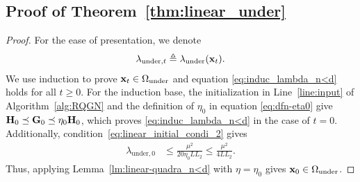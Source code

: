 \documentclass[11pt]{article}
\theoremstyle{plain}
\theoremstyle{definition}
\theoremstyle{remark}
\theoremstyle{plain}
\def\G{{\bf G}}
\def\H{{\bf H}}
\def\x{{\bf x}}
\begin{document}
\subsection{Proof of Theorem~\ref{thm:linear_under}}
\label{app:proof_theorem_linear_under}
\begin{proof}
For the ease of presentation, we denote
\begin{align*}
\lambda_{\mathrm{under},t}\triangleq\lambda_{\mathrm{under}}(\x_t).    
\end{align*}
We use induction to prove  $\x_t\in\Omega_{\mathrm{under}}$ and equation \eqref{eq:induc_lambda_n<d} holds for all $t\geq 0$.
For the induction base, the initialization in Line~\ref{line:input} of
Algorithm~\ref{alg:RQGN} and the definition of $\eta_0$ in equation \eqref{eq:dfn-eta0} give~$\H_0\preceq\G_0\preceq\eta_0\H_0$, which proves \eqref{eq:induc_lambda_n<d} in the case of $t=0$.
Additionally, condition~\eqref{eq:linear_initial_condi_2} gives
\begin{align*}
\lambda_{\mathrm{under},0}
&\leq\frac{\mu^2}{20\eta_0LL_2}
\leq\frac{\mu^2}{4LL_2}.
\end{align*}
Thus, applying Lemma~\ref{lm:linear-quadra_n<d} with $\eta=\eta_0$ gives $\x_0\in\Omega_{\mathrm{under}}$. 


\end{proof}
\end{document}
